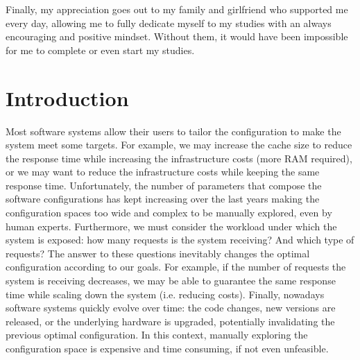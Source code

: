 \documentclass[a4paper, 12pt]{article} %
\begin{document}
	Finally, my appreciation goes out to my family and girlfriend who supported me every day, allowing me to fully dedicate myself to my studies with an always encouraging and positive mindset. Without them, it would have been impossible for me to complete or even start my studies.
	
	\clearpage
	
	\clearpage%
	\thispagestyle{empty}%
	\addtocounter{page}{-1}%
	\null%
	\clearpage
	
	\renewcommand{\contentsname}{Index}
	\newpage
	\thispagestyle{plain}
	\tableofcontents

	\clearpage%
	\thispagestyle{empty}%
	\addtocounter{page}{-1}%
	\null%
	\clearpage
	
	
	
	\newpage
	
	\section{Introduction }
	Most software systems allow their users to tailor the configuration to make the system meet some targets. For example, we may increase the cache size to reduce the response time while increasing the infrastructure costs (more RAM required), or we may want to reduce the infrastructure costs while keeping the same response time.  Unfortunately, the number of parameters that compose the software configurations has kept increasing over the last years making the configuration spaces too wide and complex to be manually explored, even by human experts. Furthermore, we must consider the workload under which the system is exposed: how many requests is the system receiving? And which type of requests? The answer to these questions inevitably changes the optimal configuration according to our goals. For example, if the number of requests the system is receiving decreases, we may be able to guarantee the same response time while scaling down the system (i.e. reducing costs). Finally, nowadays software systems quickly evolve over time: the code changes, new versions are released, or the underlying hardware is upgraded, potentially invalidating the previous optimal configuration. In this context, manually exploring the configuration space is expensive and time consuming, if not even unfeasible.	
	
\end{document}
